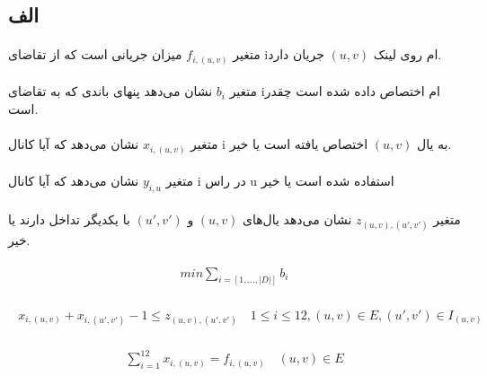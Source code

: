 \documentclass[paper=a4, fontsize=11pt]{article}
\numberwithin{equation}{section} %
\numberwithin{figure}{section} %
\numberwithin{table}{section} %
\begin{document}
\subsection{الف}
\paragraph{}
متغیر $f_{i,(u,v)}$ میزان جریانی است که از تقاضای iام روی لینک
$(u,v)$ جریان دارد.

\paragraph{}
متغیر $b_i$ نشان می‌دهد پنهای باندی که به تقاضای iام
اختصاص داده شده است چقدر است.

\paragraph{}
متغیر $x_{i,(u,v)}$ نشان می‌دهد که آیا کانال i به یال $(u,v)$
اختصاص یافته است یا خیر.

\paragraph{}
متغیر $y_{i,u}$ نشان می‌دهد
که آیا کانال i در راس u استفاده شده است یا خیر

\paragraph{}
متغیر $z_{(u,v),(u',v')}$
نشان می‌دهد یال‌های $(u,v)$ و $(u',v')$ با یکدیگر تداخل دارند یا خیر.

\begin{align}
\begin{split}
	min \sum_{i = [1, ..., |D|]} b_i
\end{split}
\end{align}

\begin{align}
\begin{split}
	x_{i,(u,v)} + x_{i,(u',v')} - 1 \le z_{(u,v),(u',v')}
	\quad
	1 \le i \le 12, (u,v) \in E, (u',v') \in I_{(u,v)}
\end{split}
\end{align}

\begin{align}
\begin{split}
	\sum_{i=1}^{12} x_{i,(u,v)} = f_{i,(u,v)}
	\quad (u,v) \in E
\end{split}
\end{align}
\end{document}
